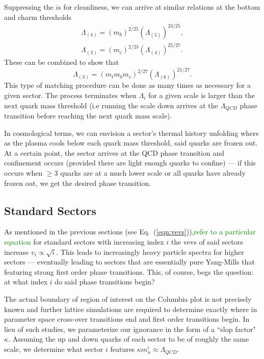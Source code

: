 \documentclass[nofootinbib,twocolumn,preprintnumbers]{revtex4-1}
\begin{document}
Suppressing the $i$s for cleanliness, we can arrive at similar relations at the bottom and charm thresholds
\begin{equation}
\begin{split}
\Lambda_{(4)} = (m_b)^{2/25}(\Lambda_{(5)})^{23/25},
\\
\Lambda_{(3)} = (m_c)^{2/23}(\Lambda_{(4)})^{25/27}.
\end{split}
\end{equation}
These can be combined to show that
\begin{equation}
\Lambda_{(3)} = (m_t m_b m_c)^{2/27}(\Lambda_{(6)})^{21/27}.
\end{equation}
This type of matching procedure can be done as many times as necessary for a given sector. The process terminates when $\Lambda_i$ for a given scale is larger than the next quark mass threshold (i.e running the scale down arrives at the $\Lambda_{QCD}$ phase transition before reaching the next quark mass scale).

In cosmological terms, we can envision a sector's thermal history unfolding where as the plasma cools below each quark mass threshold, said quarks are frozen out. At a certain point, the sector arrives at the QCD phase transition and confinement occurs (provided there are light enough quarks to confine) --- if this occurs when $\geq 3$ quarks are at a much lower scale or all quarks have already frozen out, we get the desired phase transition.   

\subsection{Standard Sectors}

As mentioned in the previous sections (see Eq.~(\ref{eqn:vevs})),\textcolor{green}{refer to a particular equation} for standard sectors with increasing index $i$ the vevs of said sectors increase $v_i\propto \sqrt{i}$. This leads to increasingly heavy particle spectra for higher sectors --- eventually leading to sectors that are essentially pure Yang-Mills that featuring strong first order phase transitions. This, of course, begs the question: at what index $i$ do said phase transitions begin?

The actual boundary of region of interest on the Columbia plot is not precisely known and further lattice simulations are required to determine exactly where in parameter space cross-over transitions end and first order transitions begin. In lieu of such studies, we parameterize our ignorance in the form of a ``slop factor" $\kappa$. Assuming the up and down quarks of each sector to be of roughly the same scale, we determine what sector $i$ features $\kappa m_u^i \approx \Lambda_{QCD}$.
\end{document}
